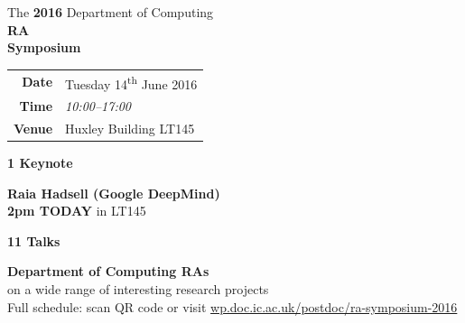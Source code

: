 \documentclass[a3,portrait]{a0poster}
\begin{document}
\begin{tcolorbox}[colback=iclightblue,colframe=iclightblue,width=\textwidth,sharp corners]
  \vskip 2cm
\noindent
{\fontsize{1.8cm}{2cm}\selectfont \color{gray}The \textbf{2016} Department of Computing}\\[3mm]
\noindent
{\fontsize{5cm}{6cm}\selectfont \color{icdarkblue} \textbf{RA}}\\
{\fontsize{5cm}{6cm}\selectfont \color{icdarkblue} \textbf{Symposium}}\\[1cm]
\end{tcolorbox}
\vspace{0.5cm}
\begin{center}
  \LARGE
  \begin{tabular}{rl}
  \textbf{Date} & Tuesday 14\textsuperscript{th} June 2016\\
  \textbf{Time} & \textit{10:00--17:00}\\
  \textbf{Venue}& Huxley Building LT145\\
  \end{tabular}
\end{center}
\begin{tcolorbox}[colback=iclightblue,colframe=iclightblue,width=\textwidth,sharp corners]
  \textcolor{icmiddlered}{\textbf{\Large 1 Keynote}}\\
\begin{center}
  \Large
  \textcolor{icdarkblue}{\bf\LARGE Raia Hadsell (Google DeepMind)}\\
  \textbf{2pm TODAY} in LT145\\
\end{center}
\textcolor{icmiddlered}{\Large\textbf{11 Talks}}\\
\begin{center}
  \Large
  \textcolor{icdarkblue}{\bf Department of Computing RAs}\\
  on a wide range of interesting research projects
  \\
  {\normalsize Full schedule: scan QR code or visit
\href{http://wp.doc.ic.ac.uk/postdoc/ra-symposium-2016}
     {wp.doc.ic.ac.uk/postdoc/ra-symposium-2016}
  }
\end{center}
\vspace{0.5cm}
\end{tcolorbox}
\end{document}
